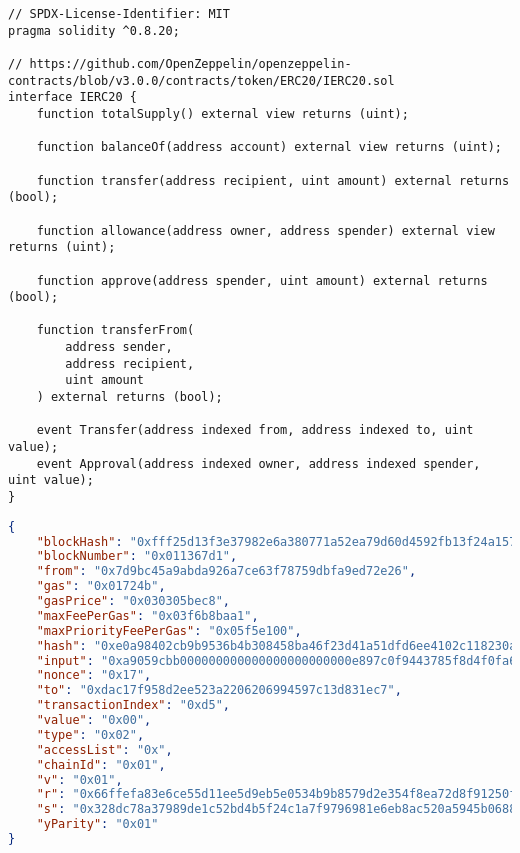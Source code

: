 \begin{lstlisting}[language=Solidity]
// SPDX-License-Identifier: MIT
pragma solidity ^0.8.20;

// https://github.com/OpenZeppelin/openzeppelin-contracts/blob/v3.0.0/contracts/token/ERC20/IERC20.sol
interface IERC20 {
    function totalSupply() external view returns (uint);

    function balanceOf(address account) external view returns (uint);

    function transfer(address recipient, uint amount) external returns (bool);

    function allowance(address owner, address spender) external view returns (uint);

    function approve(address spender, uint amount) external returns (bool);

    function transferFrom(
        address sender,
        address recipient,
        uint amount
    ) external returns (bool);

    event Transfer(address indexed from, address indexed to, uint value);
    event Approval(address indexed owner, address indexed spender, uint value);
}
\end{lstlisting}

\begin{lstlisting}[language=Json]
{
    "blockHash": "0xfff25d13f3e37982e6a380771a52ea79d60d4592fb13f24a157a96bd48cb823a",
    "blockNumber": "0x011367d1",
    "from": "0x7d9bc45a9abda926a7ce63f78759dbfa9ed72e26",
    "gas": "0x01724b",
    "gasPrice": "0x030305bec8",
    "maxFeePerGas": "0x03f6b8baa1",
    "maxPriorityFeePerGas": "0x05f5e100",
    "hash": "0xe0a98402cb9b9536b4b308458ba46f23d41a51dfd6ee4102c118230a44529cbd",
    "input": "0xa9059cbb000000000000000000000000e897c0f9443785f8d4f0fa6e...",
    "nonce": "0x17",
    "to": "0xdac17f958d2ee523a2206206994597c13d831ec7",
    "transactionIndex": "0xd5",
    "value": "0x00",
    "type": "0x02",
    "accessList": "0x",
    "chainId": "0x01",
    "v": "0x01",
    "r": "0x66ffefa83e6ce55d11ee5d9eb5e0534b9b8579d2e354f8ea72d8f91250fc5893",
    "s": "0x328dc78a37989de1c52bd4b5f24c1a7f9796981e6eb8ac520a5945b06888fef4",
    "yParity": "0x01"
}
\end{lstlisting}
